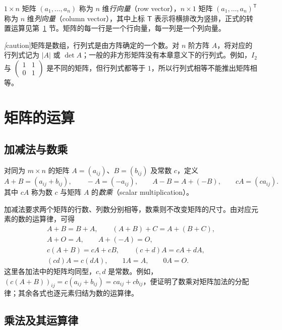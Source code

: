 \begin{definition}
\label{def:matrix-row-column-vector}
$1\times n$ 矩阵 $(a_1,\ldots,a_n)$ 称为 $n$ 维\emph{行向量}（row vector），$n\times1$ 矩阵 $(a_1,\ldots,a_n)^{\mathsf T}$ 称为 $n$ 维\emph{列向量}（column vector），其中上标 $\mathsf T$ 表示将横排改为竖排，正式的转置运算见第~\ref{sec:matrix-operations} 节。矩阵的每一行是一个行向量，每一列是一个列向量。
\end{definition}

\emph[caution]{矩阵是数组，行列式是由方阵确定的一个数。}对 $n$ 阶方阵 $A$，将对应的行列式记为 $|A|$ 或 $\det A$；一般的非方形矩阵没有本章意义下的行列式。例如，$I_2$ 与 $\begin{pmatrix}1&1\\0&1\end{pmatrix}$ 是不同的矩阵，但行列式都等于 $1$，所以行列式相等不能推出矩阵相等。

\section{矩阵的运算}
\label{sec:matrix-operations}

\subsection{加减法与数乘}

\begin{definition}
\label{def:matrix-addition-scalar}
对同为 $m\times n$ 的矩阵 $A=(a_{ij})$、$B=(b_{ij})$ 及常数 $c$，定义
\[
    A+B=(a_{ij}+b_{ij}),\qquad
    -A=(-a_{ij}),\qquad
    A-B=A+(-B),\qquad cA=(ca_{ij}).
\]
其中 $cA$ 称为数 $c$ 与矩阵 $A$ 的\emph{数乘}（scalar multiplication）。
\end{definition}

加减法要求两个矩阵的行数、列数分别相等，数乘则不改变矩阵的尺寸。由对应元素的数的运算律，可得
\[
    \begin{gathered}
        A+B=B+A,\qquad (A+B)+C=A+(B+C),\\
        A+O=A,\qquad A+(-A)=O,\\
        c(A+B)=cA+cB,\qquad (c+d)A=cA+dA,\\
        (cd)A=c(dA),\qquad 1A=A,\qquad 0A=O.
    \end{gathered}
\]
这里各加法中的矩阵均同型，$c,d$ 是常数。例如，$(c(A+B))_{ij}=c(a_{ij}+b_{ij})=ca_{ij}+cb_{ij}$，便证明了数乘对矩阵加法的分配律；其余各式也逐元素归结为数的运算律。

\subsection{乘法及其运算律}

